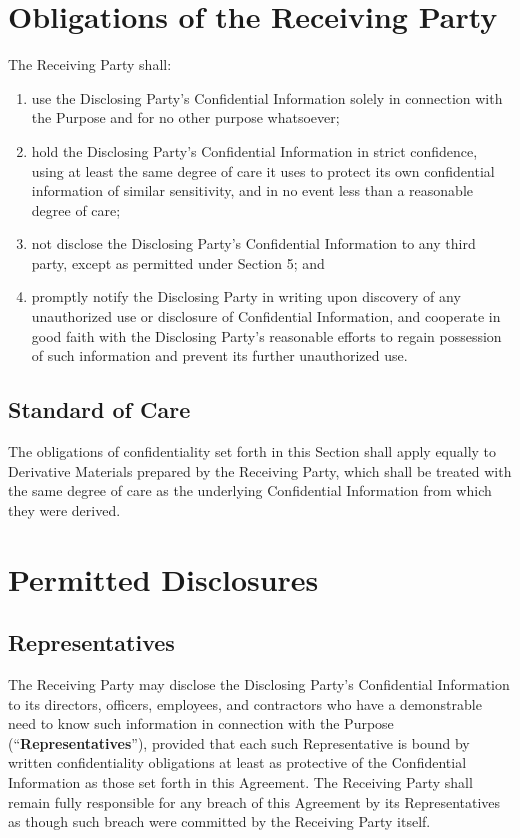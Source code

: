 \section{Obligations of the Receiving Party}

The Receiving Party shall:

\begin{enumerate}
  \item use the Disclosing Party's Confidential Information solely in connection with the Purpose and for no other purpose whatsoever;
  \item hold the Disclosing Party's Confidential Information in strict confidence, using at least the same degree of care it uses to protect its own confidential information of similar sensitivity, and in no event less than a reasonable degree of care;
  \item not disclose the Disclosing Party's Confidential Information to any third party, except as permitted under Section 5; and
  \item promptly notify the Disclosing Party in writing upon discovery of any unauthorized use or disclosure of Confidential Information, and cooperate in good faith with the Disclosing Party's reasonable efforts to regain possession of such information and prevent its further unauthorized use.
\end{enumerate}

\subsection{Standard of Care} The obligations of confidentiality set forth in this Section shall apply equally to Derivative Materials prepared by the Receiving Party, which shall be treated with the same degree of care as the underlying Confidential Information from which they were derived.

\section{Permitted Disclosures}

\subsection{Representatives} The Receiving Party may disclose the Disclosing Party's Confidential Information to its directors, officers, employees, and contractors who have a demonstrable need to know such information in connection with the Purpose (``\textbf{Representatives}''), provided that each such Representative is bound by written confidentiality obligations at least as protective of the Confidential Information as those set forth in this Agreement. The Receiving Party shall remain fully responsible for any breach of this Agreement by its Representatives as though such breach were committed by the Receiving Party itself.

